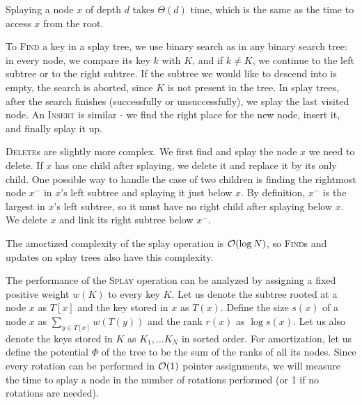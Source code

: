 Splaying a node $x$ of depth $d$ takes $\Theta(d)$ time, which is the same
as the time to access $x$ from the root.

To \textsc{Find} a key in a splay tree, we use binary search as in any
binary search tree: in every node, we compare its key $k$ with $K$, and
if $k \neq K$, we continue to the left subtree or to the right subtree.
If the subtree we would like to descend into is empty, the search is aborted,
since $K$ is not present in the tree.
In splay trees, after the search finishes (successfully or unsuccessfully),
we splay the last visited node.
An \textsc{Insert} is similar - we find the right place for the new node,
insert it, and finally splay it up.

\textsc{Delete}s are slightly more complex. We first find and splay the node $x$
we need to delete. If $x$ has one child after splaying, we delete it and replace
it by its only child. One possible way to handle the case of two children is
finding the rightmost node $x^-$ in $x$'s left subtree and splaying it just
below $x$. By definition, $x^-$ is the largest in $x$'s left subtree, so it
must have no right child after splaying below $x$. We delete $x$ and link
its right subtree below $x^-$.

The amortized complexity of the splay operation is $\mathcal{O}(\log N)$,
so \textsc{Find}s and updates on splay trees also have this complexity.

The performance of the \textsc{Splay} operation can be analyzed by assigning
a fixed positive weight $w(K)$ to every key $K$. Let us denote the subtree
rooted at a node $x$ as $T[x]$ and the key stored in $x$ as $T(x)$.
Define the size $s(x)$ of a node $x$ as $\sum_{y\in T[x]} w(T(y))$
and the rank $r(x)$ as $\log s(x)$.
Let us also denote the keys stored in $K$ as $K_1,\ldots K_N$ in sorted order.
For amortization, let us define the potential $\Phi$ of the tree to be the sum
of the ranks of all its nodes. Since every rotation can be performed in $\mathcal{O}(1)$
pointer assignments, we will measure the time to splay a node in the number
of rotations performed (or 1 if no rotations are needed).

